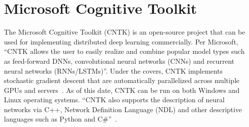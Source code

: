 \section{Microsoft Cognitive Toolkit}

The Microsoft Cognitive Toolkit (CNTK) is an open-source project that
can be used for implementing distributed deep learning commercially.
Per Microsoft, ``CNTK allows the user to easily realize and combine
popular model types such as feed-forward DNNs, convolutional neural
networks (CNNs) and recurrent neural networks (RNNs/LSTMs)''. Under the
covers, CNTK implements stochastic gradient descent that are
automatically parallelized across multiple GPUs and
servers~\cite{hid-sp18-510-web-cntk}. As of this date, CNTK can be run
on both Windows and Linux operating systems. ``CNTK also supports the
description of neural networks via C++, Network Definition
Language (NDL) and other descriptive languages such as Python and
C\#''~\cite{hid-sp18-510-kd-cntk}.
